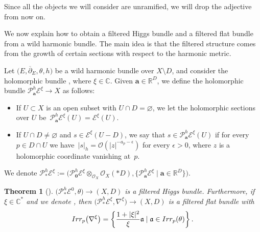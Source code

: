 \documentclass[11pt]{article}
\numberwithin{equation}{section}
\newtheorem{Theorem}{Theorem}[section]
\numberwithin{equation}{section}
\begin{document}
\begin{Remark} Since all the objects we will consider are unramified, we will drop the adjective from now on.
\end{Remark}

We now explain how to obtain a filtered Higgs bundle and a filtered flat bundle from a wild harmonic bundle. The main idea is that the filtered structure comes from the growth of certain sections with respect to the harmonic metric.

\begin{Definition}\label{phdef} Let $\bigl(E,\overline{\partial}_E,\theta,h\bigr)$ be a wild harmonic bundle over $X\setminus D$, and consider the holomorphic bundle , where $\xi\in \mathbb{C}$. Given $\boldsymbol{a}\in \mathbb{R}^D$, we define the holomorphic bundle $\mathcal{P}_{\boldsymbol{a}}^h\mathcal{E}^{\xi}\to X$ as follows:
\begin{itemize}\itemsep=0pt
 \item If $U\subset X$ is an open subset with $U\cap D=\varnothing$, we let the holomorphic sections over $U$ be~$\mathcal{P}_{\boldsymbol{a}}^h\mathcal{E}^{\xi}(U)=\mathcal{E}^{\xi}(U)$.
 \item If $U\cap D\neq \varnothing$ and $s\in \mathcal{E}^{\xi}(U-D)$, we say that $s\in \mathcal{P}^h_{\boldsymbol{a}}\mathcal{E}^{\xi}(U)$ if for every $p\in D\cap U$ we have~${|s|_h=\mathcal{O}(|z|^{-a_p-\epsilon})}$ for every $\epsilon>0$, where $z$ is a holomorphic coordinate vanishing at~$p$.
\end{itemize}
We denote $\mathcal{P}^h_*\mathcal{E}^{\xi}:=\bigl(\mathcal{P}_{\boldsymbol{0}}^h\mathcal{E}^{\xi}\otimes_{\mathcal{O}_X}\mathcal{O}_X(*D), \bigl\{\mathcal{P}_{\boldsymbol{a}}^h\mathcal{E}^{\xi} \mid \boldsymbol{a}\in \mathbb{R}^D\bigr\}\bigr)$.
\end{Definition}
\begin{Theorem}[{\cite[Theorems 7.4.3 and 7.4.5, Sections 8.1.2 and 8.1.3]{M}}]\label{compirrpar} $\bigl(\mathcal{P}^h_*\mathcal{E}^{0},\theta\bigr)\to (X,D)$ is a filtered Higgs bundle. Furthermore, if $\xi \in \mathbb{C}^*$ and we denote , then $\bigl(\mathcal{P}^h_*\mathcal{E}^{\xi},\nabla^{\xi}\bigr)\to (X,D)$ is a filtered flat bundle with \[
\textnormal{Irr}_p\bigl(\nabla^{\xi}\bigr)=\left\{\frac{1+|\xi|^2}{\xi}\mathfrak{a} \mid \mathfrak{a}\in \textnormal{Irr}_p(\theta) \right\}.
\]
\end{Theorem}
\end{document}
